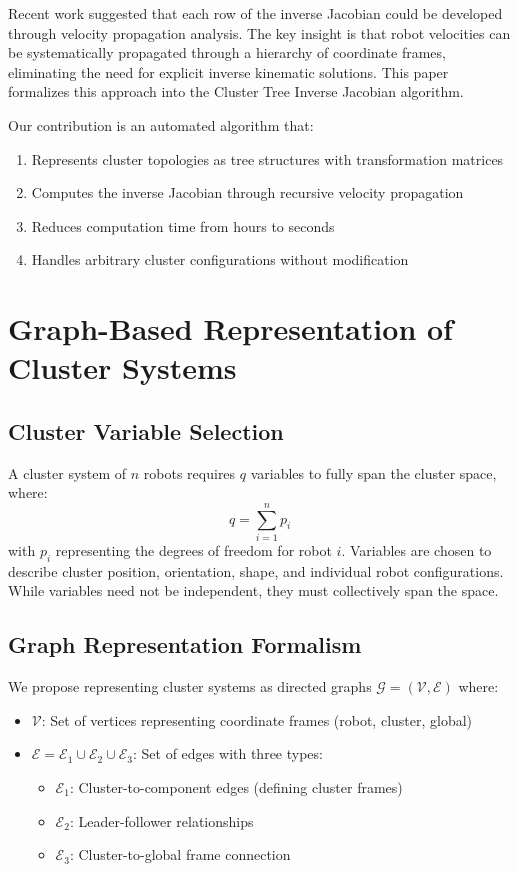 \documentclass[lettersize,journal]{IEEEtran}
\begin{document}
Recent work suggested that each row of the inverse Jacobian could be developed through velocity propagation analysis. The key insight is that robot velocities can be systematically propagated through a hierarchy of coordinate frames, eliminating the need for explicit inverse kinematic solutions. This paper formalizes this approach into the Cluster Tree Inverse Jacobian algorithm.

Our contribution is an automated algorithm that:
\begin{enumerate}
\item Represents cluster topologies as tree structures with transformation matrices
\item Computes the inverse Jacobian through recursive velocity propagation
\item Reduces computation time from hours to seconds
\item Handles arbitrary cluster configurations without modification
\end{enumerate}

\section{Graph-Based Representation of Cluster Systems}

\subsection{Cluster Variable Selection}

A cluster system of $n$ robots requires $q$ variables to fully span the cluster space, where:
\begin{equation}
q = \sum_{i=1}^{n} p_i
\end{equation}
with $p_i$ representing the degrees of freedom for robot $i$. Variables are chosen to describe cluster position, orientation, shape, and individual robot configurations. While variables need not be independent, they must collectively span the space.

\subsection{Graph Representation Formalism}

We propose representing cluster systems as directed graphs $\mathcal{G} = (\mathcal{V}, \mathcal{E})$ where:
\begin{itemize}
\item $\mathcal{V}$: Set of vertices representing coordinate frames (robot, cluster, global)
\item $\mathcal{E} = \mathcal{E}_1 \cup \mathcal{E}_2 \cup \mathcal{E}_3$: Set of edges with three types:
  \begin{itemize}
  \item $\mathcal{E}_1$: Cluster-to-component edges (defining cluster frames)
  \item $\mathcal{E}_2$: Leader-follower relationships
  \item $\mathcal{E}_3$: Cluster-to-global frame connection
  \end{itemize}
\end{itemize}
\end{document}
